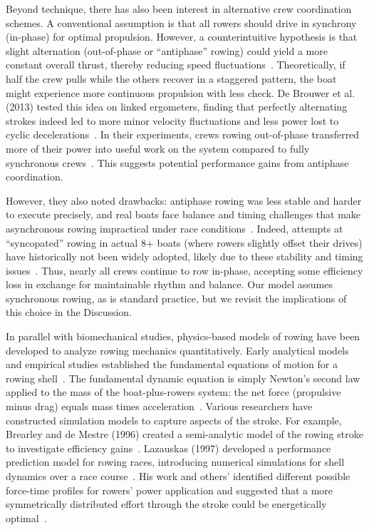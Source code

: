 \documentclass[12pt]{article}
\begin{document}
Beyond technique, there has also been interest in alternative crew coordination schemes. A conventional assumption is that all rowers should drive in synchrony (in-phase) for optimal propulsion. However, a counterintuitive hypothesis is that slight alternation (out-of-phase or “antiphase” rowing) could yield a more constant overall thrust, thereby reducing speed fluctuations~\cite{debrouwer2013, debrouwer2013}. Theoretically, if half the crew pulls while the others recover in a staggered pattern, the boat might experience more continuous propulsion with less check. De Brouwer et al. (2013) tested this idea on linked ergometers, finding that perfectly alternating strokes indeed led to more minor velocity fluctuations and less power lost to cyclic decelerations~\cite{debrouwer2013, cuijpers2015}. In their experiments, crews rowing out-of-phase transferred more of their power into useful work on the system compared to fully synchronous crews~\cite{debrouwer2013, cuijpers2015}. This suggests potential performance gains from antiphase coordination. 

However, they also noted drawbacks: antiphase rowing was less stable and harder to execute precisely, and real boats face balance and timing challenges that make asynchronous rowing impractical under race conditions~\cite{debrouwer2013, cuijpers2015}. Indeed, attempts at “syncopated” rowing in actual 8+ boats (where rowers slightly offset their drives) have historically not been widely adopted, likely due to these stability and timing issues~\cite{rowinginmotion2016}. Thus, nearly all crews continue to row in-phase, accepting some efficiency loss in exchange for maintainable rhythm and balance. Our model assumes synchronous rowing, as is standard practice, but we revisit the implications of this choice in the Discussion.

In parallel with biomechanical studies, physics-based models of rowing have been developed to analyze rowing mechanics quantitatively. Early analytical models and empirical studies established the fundamental equations of motion for a rowing shell~\cite{sandersonmartindale1986, baudouinhawkins2002}. The fundamental dynamic equation is simply Newton’s second law applied to the mass of the boat-plus-rowers system: the net force (propulsive minus drag) equals mass times acceleration~\cite{pulman2007}. Various researchers have constructed simulation models to capture aspects of the stroke. For example, Brearley and de Mestre (1996) created a semi-analytic model of the rowing stroke to investigate efficiency gains~\cite{brearleydemestre1996}. Lazauskas (1997) developed a performance prediction model for rowing races, introducing numerical simulations for shell dynamics over a race course~\cite{lazauskas1997}. His work and others’ identified different possible force-time profiles for rowers’ power application and suggested that a more symmetrically distributed effort through the stroke could be energetically optimal~\cite{lazauskas1997}. 
\end{document}
